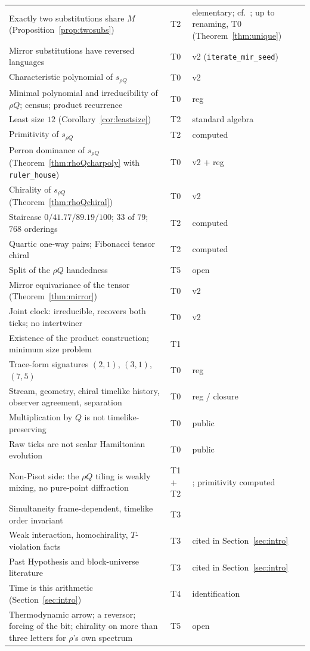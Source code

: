\documentclass[11pt]{amsart}
\theoremstyle{plain}
\theoremstyle{definition}
\theoremstyle{remark}
\begin{document}
{\begin{longtable}{p{}p{}p{}}
Exactly two substitutions share $M$ (Proposition~\ref{prop:twosubs}) & T2 & elementary; cf.\ \cite{mercat2020}; up to renaming, T0 (Theorem~\ref{thm:unique}) \\
Mirror substitutions have reversed languages & T0 & v2 (\texttt{iterate\_mir\_seed}) \\
Characteristic polynomial of $s_{\rho Q}$ & T0 & v2 \\
Minimal polynomial and irreducibility of $\rho Q$; census; product recurrence & T0 & reg \cite{palomar-compositum} \\
Least size $12$ (Corollary~\ref{cor:leastsize}) & T2 & standard algebra \\
Primitivity of $s_{\rho Q}$ & T2 & computed \\
Perron dominance of $s_{\rho Q}$ (Theorem~\ref{thm:rhoQcharpoly} with \texttt{ruler\_house}) & T0 & v2 + reg \cite{palomar-compositum} \\
Chirality of $s_{\rho Q}$ (Theorem~\ref{thm:rhoQchiral}) & T0 & v2 \\
Staircase $0/41.77/89.19/100$; $33$ of $79$; $768$ orderings & T2 & computed \\
Quartic one-way pairs; Fibonacci tensor chiral & T2 & computed \\
Split of the $\rho Q$ handedness & T5 & open \\
Mirror equivariance of the tensor (Theorem~\ref{thm:mirror}) & T0 & v2 \\
Joint clock: irreducible, recovers both ticks; no intertwiner & T0 & v2 \\
Existence of the product construction; minimum size problem & T1 & \cite{lind1983,lind1984,boylelind2002,bertrandmathis2021,yazdi2021} \\
Trace-form signatures $(2,1)$, $(3,1)$, $(7,5)$ & T0 & reg \cite{palomar-trace} \\
Stream, geometry, chiral timelike history, observer agreement, separation & T0 & reg / closure \cite{palomar-cph} \\
Multiplication by $Q$ is not timelike-preserving & T0 & public \cite{pdtlean} \\
Raw ticks are not scalar Hamiltonian evolution & T0 & public \cite{pdtlean} \\
Non-Pisot side: the $\rho Q$ tiling is weakly mixing, no pure-point diffraction & T1 + T2 & \cite{solomyak1997,solomyak2007,dworkin1993,baakelenz2004}; primitivity computed \\
Simultaneity frame-dependent, timelike order invariant & T3 & \cite{zeeman1964,hawkingellis1973} \\
Weak interaction, homochirality, $T$-violation facts & T3 & cited in Section~\ref{sec:intro} \\
Past Hypothesis and block-universe literature & T3 & cited in Section~\ref{sec:intro} \\
Time is this arithmetic (Section~\ref{sec:intro}) & T4 & identification \\
Thermodynamic arrow; a reversor; forcing of the bit; chirality on more than three letters for $\rho$'s own spectrum & T5 & open \\
\hline
\end{longtable}
}
\end{document}
